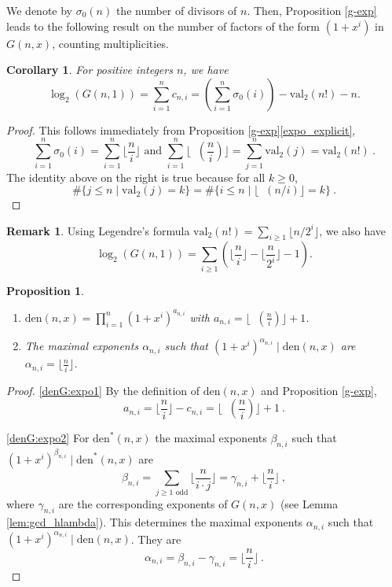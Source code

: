 \documentclass[reqno]{amsart}
\def\G{G}
\def\e{\gamma}
\def\den{\mathrm{den}}
\def\val{\mathrm{val}}
\DeclareMathOperator{\lb}{\log_2}
\newtheorem{corollary}[theorem]{Corollary}
\newtheorem{proposition}[theorem]{Proposition}
\theoremstyle{definition}
\newtheorem{remark}{Remark}
\begin{document}
We denote by $\sigma_0(n)$ the number of divisors of $n$. Then, Proposition \ref{g-exp}  leads to the following result on  the number of  factors of the form $(1+x^i)$ in $G(n,x)$, counting multiplicities. 

\begin{corollary}\label{sum_c(n,i)}
     For positive integers $n$, we have $$\log_2(\G(n,1))=\sum_{i=1}^n c_{n,i}=\left(\sum_{i=1}^n \sigma_0(i)\right)-\val_2(n!)-n.$$ 
\end{corollary}

\begin{proof} This follows immediately from Proposition \ref{g-exp}\ref{expo_explicit},
   $$\sum_{i=1}^n\sigma_0(i)=\sum_{i=1}^n\lfloor\frac{n}{i}\rfloor \text{\ \ \ \  and \ \ \ \ } \sum_{i=1}^n\lfloor\lb(\frac{n}{i})\rfloor=\sum_{j=1}^n\val_2(j)=\val_2(n!)\: .$$
 The  identity above on the right  is true because for all $k\geq 0$,  \[\#\{j\leq n\mid \val_2(j)=k\}=\#\{i\leq n\mid \lfloor\lb(n/i)\rfloor=k\}\: .\] 
\end{proof}
\begin{remark} 
  Using  Legendre's formula $\val_2(n!)=\sum_{i\geq 1}\lfloor n/2^i \rfloor$, we also have  $$\log_2(G(n,1))=\sum_{i\geq 1}(\lfloor\frac{n}{i}\rfloor-\lfloor\frac{n}{2^i}\rfloor-1).$$ 
\end{remark}
\begin{proposition}\label{prop:den_G}$ $
\begin{enumerate}[label=(\alph*)]
\item\label{denG:expo1} $\den(n,x)=\prod_{i=1}^{n}(1+x^i)^{a_{n,i}}$ with $a_{n,i}=\lfloor\lb(\frac{n}{i})\rfloor+1$.
\item\label{denG:expo2} The maximal exponents $\alpha_{n,i}$ such that $(1+x^i)^{\alpha_{n,i}}\mid\den(n,x)$ are $\alpha_{n,i}=\lfloor\frac{n}{i}\rfloor$.
\end{enumerate}    
\end{proposition}
\begin{proof}
\ref{denG:expo1} By the definition of $\den(n,x)$ and Proposition \ref{g-exp}, 
\[a_{n,i}=\lfloor \frac{n}{i}\rfloor-c_{n,i}=\lfloor\lb(\frac{n}{i})\rfloor+1\:.\]

\ref{denG:expo2} For $\den^*(n,x)$ the maximal exponents $\beta_{n,i}$  such that $(1+x^i)^{\beta_{n,i}}\mid\den^*(n,x)$ are
\[\beta_{n,i}=\sum_{j\geq 1\textrm{ odd}}\lfloor\frac{n}{i\cdot j}\rfloor=\e_{n,i}+\lfloor\frac{n}{i}\rfloor\:, \]
where $\e_{n,i}$ are the corresponding exponents of $G(n,x)$ (see Lemma \ref{lem:gcd_hlambda}). This determines the maximal exponents $\alpha_{n,i}$  such that $(1+x^i)^{\alpha_{n,i}}\mid \den(n,x)$. They are
\[\alpha_{n,i}=\beta_{n,i}-\e_{n,i}=\lfloor\frac{n}{i}\rfloor\:.\]
\end{proof}
\end{document}
